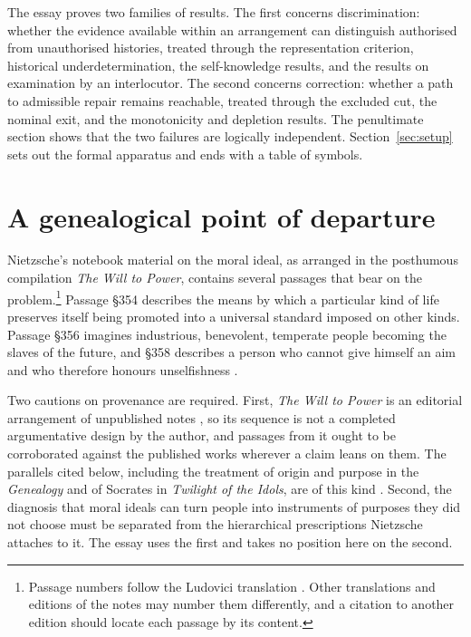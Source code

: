 \documentclass[11pt]{article}
\theoremstyle{definition}
\theoremstyle{remark}
\begin{document}
The essay proves two families of results. The first concerns discrimination: whether the evidence available within an arrangement can distinguish authorised from unauthorised histories, treated through the representation criterion, historical underdetermination, the self-knowledge results, and the results on examination by an interlocutor. The second concerns correction: whether a path to admissible repair remains reachable, treated through the excluded cut, the nominal exit, and the monotonicity and depletion results. The penultimate section shows that the two failures are logically independent. Section~\ref{sec:setup} sets out the formal apparatus and ends with a table of symbols.

\section{A genealogical point of departure}

Nietzsche's notebook material on the moral ideal, as arranged in the posthumous compilation \emph{The Will to Power}, contains several passages that bear on the problem.\footnote{Passage numbers follow the Ludovici translation \cite{nietzscheWTP}. Other translations and editions of the notes may number them differently, and a citation to another edition should locate each passage by its content.} Passage \S354 describes the means by which a particular kind of life preserves itself being promoted into a universal standard imposed on other kinds. Passage \S356 imagines industrious, benevolent, temperate people becoming the slaves of the future, and \S358 describes a person who cannot give himself an aim and who therefore honours unselfishness \cite[\S\S354, 356, 358]{nietzscheWTP}.

Two cautions on provenance are required. First, \emph{The Will to Power} is an editorial arrangement of unpublished notes \cite{montinari2003}, so its sequence is not a completed argumentative design by the author, and passages from it ought to be corroborated against the published works wherever a claim leans on them. The parallels cited below, including the treatment of origin and purpose in the \emph{Genealogy} and of Socrates in \emph{Twilight of the Idols}, are of this kind \cite{nietzscheGM,nietzscheTI}. Second, the diagnosis that moral ideals can turn people into instruments of purposes they did not choose must be separated from the hierarchical prescriptions Nietzsche attaches to it. The essay uses the first and takes no position here on the second.
\end{document}
